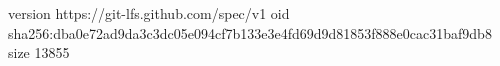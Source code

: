 version https://git-lfs.github.com/spec/v1
oid sha256:dba0e72ad9da3c3dc05e094cf7b133e3e4fd69d9d81853f888e0cac31baf9db8
size 13855
